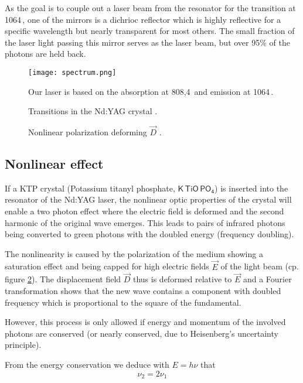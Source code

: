 As the goal is to couple out a laser beam from the resonator for the transition at 1064\,\nano\metre, one of the mirrors is a dichrioc reflector which is highly reflective for a specific wavelength but nearly transparent for most others. The small fraction of the laser light passing this mirror serves as the laser beam, but over 95\% of the photons are held back.

\begin{figure}[p]
	\centering
	\texttt{[image: spectrum.png]}
	\caption{Transitions in the Nd:YAG crystal \cite{lit:leybold}.}
	Our laser is based on the absorption at 808,4\,\nano\metre{} and emission at 1064\,\nano\metre.
	\label{fig:spectrum}
\end{figure}

\begin{figure}[p]
	\centering
	\def\svgwidth{0.7\textwidth}
	
	\caption{Nonlinear polarization deforming $\vec D$ \cite{lit:manual}.}
	\label{fig:nonlinear}
\end{figure}

\subsection{Nonlinear effect}
If a KTP crystal (Potassium titanyl phosphate, $\mathsf{K\,TiO\,PO_4}$) is inserted into the resonator of the Nd:YAG laser, the nonlinear optic properties of the crystal will enable a two photon effect where the electric field is deformed and the second harmonic of the original wave emerges. This leads to pairs of infrared photons being converted to green photons with the doubled energy (frequency doubling).

The nonlinearity is caused by the polarization of the medium showing a saturation effect and being capped for high electric fields $\vec E$ of the light beam (cp. figure \ref{fig:nonlinear}). The displacement field $\vec D$ thus is deformed relative to $\vec E$ and a Fourier transformation shows that the new wave contains a component with doubled frequency which is proportional to the square of the fundamental.

However, this process is only allowed if energy and momentum of the involved photons are conserved (or nearly conserved, due to Heisenberg's uncertainty principle).

From the energy conservation  we deduce with $E = h \nu$ that
\begin{equation}
	\nu_2 = 2 \nu_1
\end{equation}

